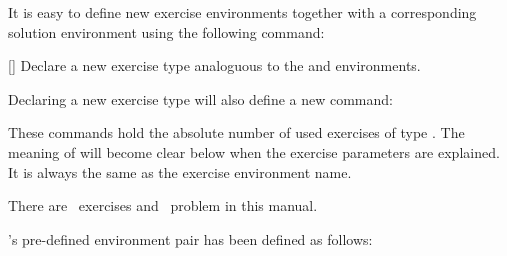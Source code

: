 \documentclass{xsim-manual}
\begin{document}
It is easy to define new exercise environments together with a corresponding
solution environment using the following command:
\begin{commands}
  []
    Declare a new exercise type analoguous to the  and
     environments.
\end{commands}
Declaring a new exercise type will also define a new command:
\begin{commands}
    These commands hold the absolute number of used exercises of type
    .  The meaning of  will become clear below
    when the exercise parameters are explained.  It is always the same as the
    exercise environment name.
\end{commands}
\begin{example}
  There are \numberofexercises~exercises and \numberofproblems~problem in this
  manual.
\end{example}
\xsim's pre-defined environment pair has been defined as
follows:
\begin{sourcecode}
\end{sourcecode}
\end{document}

